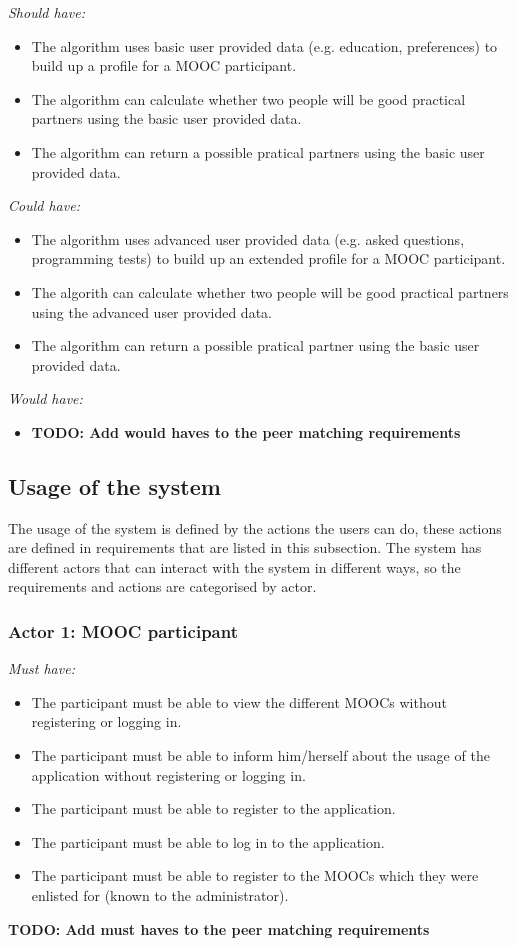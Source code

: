 \documentclass[]{article}
\newcommand{\TODO}[1]{{\color{red}\textbf{TODO: #1}}}
\begin{document}
\emph{Should have:}
\begin{itemize}
\item The algorithm uses basic user provided data (e.g. education, preferences) to build up a profile for a MOOC participant.
\item The algorithm can calculate whether two people will be good practical partners using the basic user provided data.
\item The algorithm can return a possible pratical partners using the basic user provided data.
\end{itemize}

\emph{Could have:}
\begin{itemize}
\item The algorithm uses advanced user provided data (e.g. asked questions, programming tests) to build up an extended profile for a MOOC participant.
\item The algorith can calculate whether two people will be good practical partners using the advanced user provided data.
\item The algorithm can return a possible pratical partner using the basic user provided data.
\end{itemize}

\emph{Would have:}
\begin{itemize}
\item \TODO{Add would haves to the peer matching requirements}
\end{itemize}

\subsection{Usage of the system}
The usage of the system is defined by the actions the users can do, these actions are defined in requirements that are listed in this subsection.
The system has different actors that can interact with the system in different ways, so the requirements and actions are categorised by actor.

\subsubsection{Actor 1: MOOC participant}
\emph{Must have:}
\begin{itemize}
\item The participant must be able to view the different MOOCs without registering or logging in.
\item The participant must be able to inform him/herself about the usage of the application without registering or logging in.
\item The participant must be able to register to the application.
\item The participant must be able to log in to the application.
\item The participant must be able to register to the MOOCs which they were enlisted for (known to the administrator).
\end{itemize}
\TODO{Add must haves to the peer matching requirements}
\end{document}
